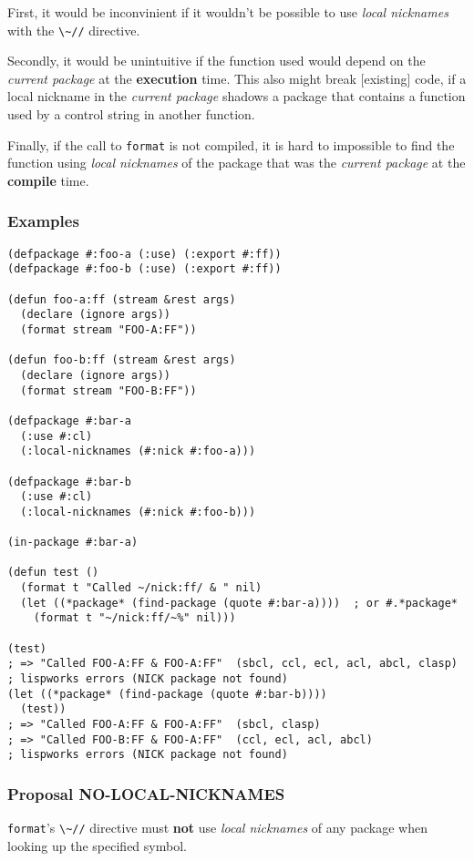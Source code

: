 \documentclass[11pt]{article}
\begin{document}
First, it would be inconvinient if it wouldn't be possible to use \emph{local
nicknames} with the \texttt{\textbackslash{}\textasciitilde{}//} directive.

Secondly, it would be unintuitive if the function used would depend on the
\emph{current package} at the \textbf{execution} time. This also might break [existing] code,
if a local nickname in the \emph{current package} shadows a package that contains a
function used by a control string in another function.

Finally, if the call to \texttt{format} is not compiled, it is hard to impossible to find
the function using \emph{local nicknames} of the package that was the \emph{current package}
at the \textbf{compile} time.
\subsubsection{Examples}
\label{sec:orgdcef506}
\begin{verbatim}
(defpackage #:foo-a (:use) (:export #:ff))
(defpackage #:foo-b (:use) (:export #:ff))

(defun foo-a:ff (stream &rest args)
  (declare (ignore args))
  (format stream "FOO-A:FF"))

(defun foo-b:ff (stream &rest args)
  (declare (ignore args))
  (format stream "FOO-B:FF"))

(defpackage #:bar-a
  (:use #:cl)
  (:local-nicknames (#:nick #:foo-a)))

(defpackage #:bar-b
  (:use #:cl)
  (:local-nicknames (#:nick #:foo-b)))

(in-package #:bar-a)

(defun test ()
  (format t "Called ~/nick:ff/ & " nil)
  (let ((*package* (find-package (quote #:bar-a))))  ; or #.*package*
    (format t "~/nick:ff/~%" nil)))

(test)
; => "Called FOO-A:FF & FOO-A:FF"  (sbcl, ccl, ecl, acl, abcl, clasp)
; lispworks errors (NICK package not found)
(let ((*package* (find-package (quote #:bar-b))))
  (test))
; => "Called FOO-A:FF & FOO-A:FF"  (sbcl, clasp)
; => "Called FOO-B:FF & FOO-A:FF"  (ccl, ecl, acl, abcl)
; lispworks errors (NICK package not found)
\end{verbatim}
\subsubsection{Proposal NO-LOCAL-NICKNAMES}
\label{sec:orgcb58369}
\texttt{format}'s \texttt{\textbackslash{}\textasciitilde{}//} directive must \textbf{not} use \emph{local nicknames} of any package when
looking up the specified symbol.
\end{document}
